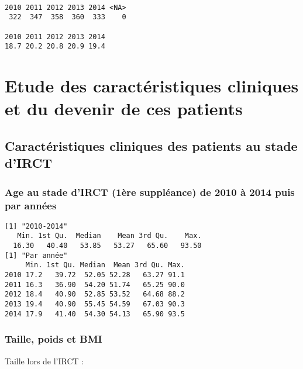 \documentclass[11pt,a4paper]{article}\usepackage[]{graphicx}\usepackage[]{color}
\makeatletter
\newenvironment{kframe}{%
 \def\at@end@of@kframe{}%
 \ifinner\ifhmode%
  \def\at@end@of@kframe{\end{minipage}}%
  \begin{minipage}{\columnwidth}%
 \fi\fi%
 \def\FrameCommand##1{\hskip\@totalleftmargin \hskip-\fboxsep
 \colorbox{shadecolor}{##1}\hskip-\fboxsep
     \hskip-\linewidth \hskip-\@totalleftmargin \hskip\columnwidth}%
 \MakeFramed {\advance\hsize-\width
   \@totalleftmargin\z@ \linewidth\hsize
   \@setminipage}}%
 {\par\unskip\endMakeFramed%
 \at@end@of@kframe}
\newenvironment{knitrout}{}{} %
\makeatother
\begin{document}
\begin{knitrout}
\color{fgcolor}\begin{kframe}
\begin{verbatim}

2010 2011 2012 2013 2014 <NA> 
 322  347  358  360  333    0 

2010 2011 2012 2013 2014 
18.7 20.2 20.8 20.9 19.4 
\end{verbatim}
\end{kframe}
\end{knitrout}

\section{Etude des caractéristiques cliniques et du devenir de ces patients}

  \subsection{Caractéristiques cliniques des patients au stade d’IRCT}
  
    \subsubsection{Age au stade d’IRCT (1ère suppléance) de 2010 à 2014 puis par années}

\begin{knitrout}
\color{fgcolor}\begin{kframe}
\begin{verbatim}
[1] "2010-2014"
   Min. 1st Qu.  Median    Mean 3rd Qu.    Max. 
  16.30   40.40   53.85   53.27   65.60   93.50 
[1] "Par année"
     Min. 1st Qu. Median  Mean 3rd Qu. Max.
2010 17.2   39.72  52.05 52.28   63.27 91.1
2011 16.3   36.90  54.20 51.74   65.25 90.0
2012 18.4   40.90  52.85 53.52   64.68 88.2
2013 19.4   40.90  55.45 54.59   67.03 90.3
2014 17.9   41.40  54.30 54.13   65.90 93.5
\end{verbatim}
\end{kframe}
\end{knitrout}

    \subsubsection{Taille, poids et BMI}
  
Taille lors de l'IRCT :
  
\end{document}
